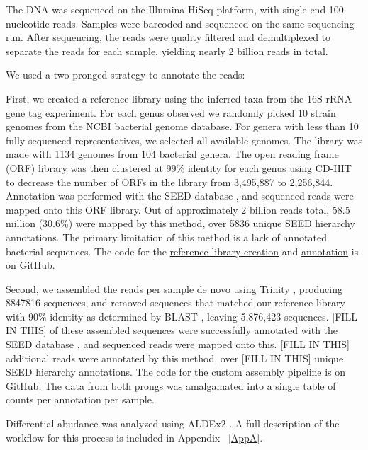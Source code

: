 The DNA was sequenced on the Illumina HiSeq platform, with single end 100 nucleotide reads. Samples were barcoded and sequenced on the same sequencing run. After sequencing, the reads were quality filtered and demultiplexed to separate the reads for each sample, yielding nearly 2 billion reads in total.

We used a two pronged strategy to annotate the reads:

First, we created a reference library using the inferred taxa from the 16S rRNA gene tag experiment. For each genus observed we randomly picked 10 strain genomes from the NCBI bacterial genome database. For genera with less than 10 fully sequenced representatives, we selected all available genomes. The library was made with 1134 genomes from 104 bacterial genera. The open reading frame (ORF) library was then clustered at 99\% identity for each genus using CD-HIT \cite{li2006cd} to decrease the number of ORFs in the library from 3,495,887 to 2,256,844. Annotation was performed with the SEED database \cite{overbeek2005subsystems}, and sequenced reads were mapped onto this ORF library. Out of approximately 2 billion reads total, 58.5 million (30.6\%) were mapped by this method, over 5836 unique SEED hierarchy annotations. The primary limitation of this method is a lack of annotated bacterial sequences. The code for the \href{https://github.com/ruthgrace/make_functional_mapping_library}{reference library creation} and \href{https://github.com/ruthgrace/mapping_library_annotated_counts}{annotation} is on GitHub.

Second, we assembled the reads per sample de novo using Trinity \cite{haas2013novo}, producing 8847816 sequences, and removed sequences that matched our reference library with 90\% identity as determined by BLAST \cite{altschul1990basic}, leaving 5,876,423 sequences. [FILL IN THIS] of these assembled sequences were successfully annotated with the SEED database \cite{overbeek2005subsystems}, and sequenced reads were mapped onto this. [FILL IN THIS] additional reads were annotated by this method, over [FILL IN THIS] unique SEED hierarchy annotations. The code for the custom assembly pipeline is on \href{https://github.com/ruthgrace/exploring_nafld_assembly}{GitHub}. The data from both prongs was amalgamated into a single table of counts per annotation per sample.

Differential abudance was analyzed using ALDEx2 \cite{fernandes2014unifying}. A full description of the workflow for this process is included in Appendix ~\ref{AppA}.


